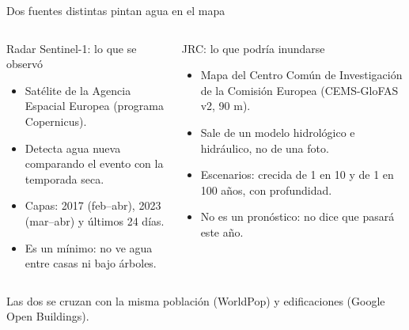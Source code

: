 \documentclass[aspectratio=169,11pt]{beamer}
\begin{document}
{
\begin{frame}
\end{frame}}

\begin{frame}{Dos fuentes distintas pintan agua en el mapa}
\begin{columns}[T]
\begin{block}{Radar Sentinel-1: lo que se observó}
\small
\begin{itemize}
\item Satélite de la Agencia Espacial Europea (programa Copernicus).
\item Detecta agua \alert{nueva} comparando el evento con la temporada seca.
\item Capas: 2017 (feb--abr), 2023 (mar--abr) y últimos 24 días.
\item Es un \alert{mínimo}: no ve agua entre casas ni bajo árboles.
\end{itemize}
\end{block}
\begin{block}{JRC: lo que podría inundarse}
\small
\begin{itemize}
\item Mapa del Centro Común de Investigación de la Comisión Europea (CEMS-GloFAS v2, 90 m).
\item Sale de un \alert{modelo} hidrológico e hidráulico, no de una foto.
\item Escenarios: crecida de 1 en 10 y de 1 en 100 años, con profundidad.
\item No es un pronóstico: no dice que pasará este año.
\end{itemize}
\end{block}
\end{columns}
\vspace{6pt}
\centering\small Las dos se cruzan con la misma población (WorldPop) y edificaciones (Google Open Buildings).
\end{frame}
\end{document}
